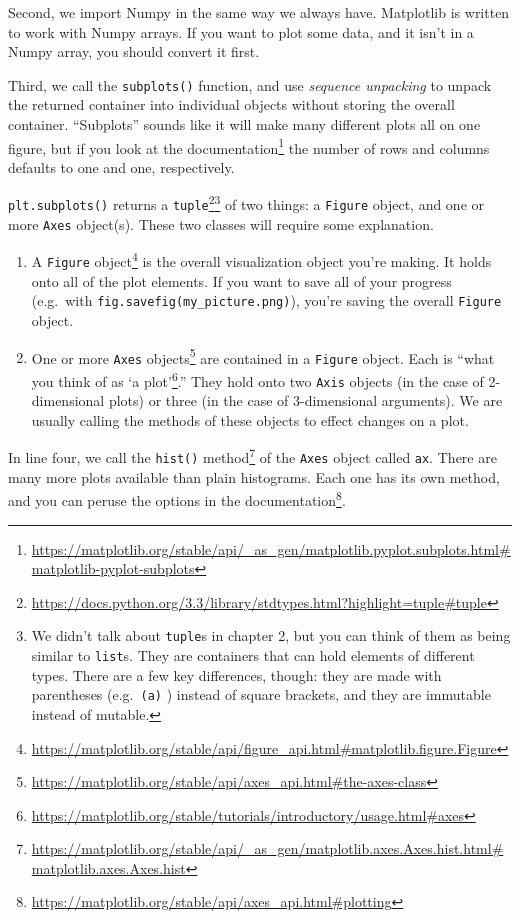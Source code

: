 \documentclass[
  12pt,
  krantz2]{krantz}
\renewcommand{\href}[2]{#2\footnote{\url{#1}}}
\begin{document}
Second, we import Numpy in the same way we always have. Matplotlib is written to work with Numpy arrays. If you want to plot some data, and it isn't in a Numpy array, you should convert it first.

Third, we call the \texttt{subplots()} function, and use \emph{sequence unpacking} to unpack the returned container into individual objects without storing the overall container. ``Subplots'' sounds like it will make many different plots all on one figure, but if you look at the \href{https://matplotlib.org/stable/api/_as_gen/matplotlib.pyplot.subplots.html\#matplotlib-pyplot-subplots}{documentation} the number of rows and columns defaults to one and one, respectively.

\texttt{plt.subplots()} returns a \href{https://docs.python.org/3.3/library/stdtypes.html?highlight=tuple\#tuple}{\texttt{tuple}}\footnote{We didn't talk about \texttt{tuple}s in chapter 2, but you can think of them as being similar to \texttt{list}s. They are containers that can hold elements of different types. There are a few key differences, though: they are made with parentheses (e.g.~\texttt{(\textquotesingle{}a\textquotesingle{})} ) instead of square brackets, and they are immutable instead of mutable.} of two things: a \texttt{Figure} object, and one or more \texttt{Axes} object(s). These two classes will require some explanation.

\begin{enumerate}
\def\labelenumi{\arabic{enumi}.}
\item
  A \href{https://matplotlib.org/stable/api/figure_api.html\#matplotlib.figure.Figure}{\texttt{Figure} object} is the overall visualization object you're making. It holds onto all of the plot elements. If you want to save all of your progress (e.g.~with \texttt{fig.savefig(\textquotesingle{}my\_picture.png\textquotesingle{})}), you're saving the overall \texttt{Figure} object.
\item
  One or more \href{https://matplotlib.org/stable/api/axes_api.html\#the-axes-class}{\texttt{Axes} objects} are contained in a \texttt{Figure} object. Each is ``\href{https://matplotlib.org/stable/tutorials/introductory/usage.html\#axes}{what you think of as `a plot'}.'' They hold onto two \texttt{Axis} objects (in the case of 2-dimensional plots) or three (in the case of 3-dimensional arguments). We are usually calling the methods of these objects to effect changes on a plot.
\end{enumerate}

In line four, we call the \href{https://matplotlib.org/stable/api/_as_gen/matplotlib.axes.Axes.hist.html\#matplotlib.axes.Axes.hist}{\texttt{hist()} method} of the \texttt{Axes} object called \texttt{ax}. There are many more plots available than plain histograms. Each one has its own method, and you can peruse the options in \href{https://matplotlib.org/stable/api/axes_api.html\#plotting}{the documentation}.
\end{document}
